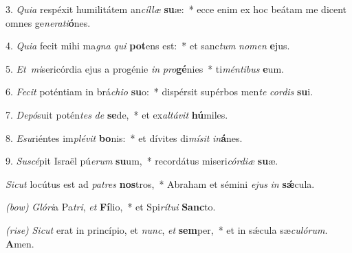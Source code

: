 3. \textit{Quia} respéxit humilitátem an\textit{cíl}\textit{læ} \textbf{su}æ:~* ecce enim ex hoc beátam me dicent omnes ge\textit{ne}\textit{ra}\textit{ti}\textbf{ó}nes.

4. \textit{Quia} fecit mihi ma\textit{gna} \textit{qui} \textbf{pot}ens est:~* et sanc\textit{tum} \textit{no}\textit{men} \textbf{e}jus.

5. \textit{Et\ mi}sericórdia ejus a progénie \textit{in} \textit{pro}\textbf{gé}nies~* ti\textit{mén}\textit{ti}\textit{bus} \textbf{e}um.

6. \textit{Fecit} poténtiam in brá\textit{chi}\textit{o} \textbf{su}o:~* dispérsit supérbos men\textit{te} \textit{cor}\textit{dis} \textbf{su}i.

7. \textit{Depó}suit potén\textit{tes} \textit{de} \textbf{se}de,~* et ex\textit{al}\textit{tá}\textit{vit} \textbf{hú}miles.

8. \textit{Esu}riéntes im\textit{plé}\textit{vit} \textbf{bo}nis:~* et dívites di\textit{mí}\textit{sit} \textit{in}\textbf{á}nes.

9. \textit{Suscé}pit Israël pú\textit{e}\textit{rum} \textbf{su}um,~* recordátus miseri\textit{cór}\textit{di}\textit{æ} \textbf{su}æ.

\textit{Sicut} locútus est ad \textit{pa}\textit{tres} \textbf{nos}tros,~* Abraham et sémini \textit{e}\textit{jus} \textit{in} \textbf{s\'{\ae}}cula.

\textit{(bow)} \textit{Glóri}a Pa\textit{tri}, \textit{et} \textbf{Fí}lio,~* et Spi\textit{rí}\textit{tu}\textit{i} \textbf{Sanc}to.

\textit{(rise)} \textit{Sicut} erat in princípio, et \textit{nunc}, \textit{et} \textbf{sem}per,~* et in s\'{\ae}cula sæ\textit{cu}\textit{ló}\textit{rum}. \textbf{A}men.